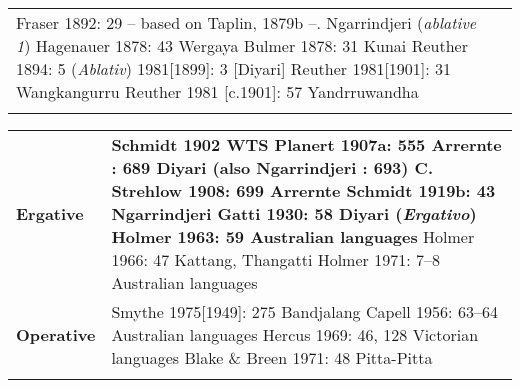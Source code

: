 \begin{table}
\begin{tabular}{p{2cm}p{9cm}}
		\newline Fraser 1892: 29 – based on Taplin, 1879b –. Ngarrindjeri (\textit{ablative 1})
		\newline Hagenauer 1878: 43 Wergaya
		\newline Bulmer 1878: 31 Kunai
		\newline Reuther 1894: 5 (\textit{Ablativ}) 1981[1899]: 3 [Diyari]
		\newline Reuther 1981[1901]: 31 Wangkangurru 
		\newline Reuther 1981 [c.1901]: 57 Yandrruwandha \\
		\lspbottomrule
	\end{tabular}
\end{table}

\begin{table}
	\small
	\begin{tabular}{p{2cm}p{9cm}}
	\lsptoprule
	\textbf{Ergative} &	\textbf{Schmidt 1902 WTS
		\newline Planert 1907a: 555 Arrernte
		\newline 1908: 689 Diyari (also Ngarrindjeri : 693)
		\newline C. Strehlow 1908: 699 Arrernte
		\newline Schmidt 1919b: 43 Ngarrindjeri 
		\newline Gatti 1930: 58 Diyari (\textit{Ergativo})
		\newline Holmer 1963: 59 Australian languages}
	\newline Holmer 1966: 47 Kattang, Thangatti
	\newline Holmer 1971: 7--8 Australian languages \\
	\textbf{Operative}	& Smythe 1975[1949]: 275 Bandjalang
	\newline Capell 1956: 63--64 Australian languages
	\newline Hercus 1969: 46, 128 Victorian languages 
	\newline Blake \& Breen 1971: 48 Pitta-Pitta \\
	\lspbottomrule
	\end{tabular}
\end{table}

